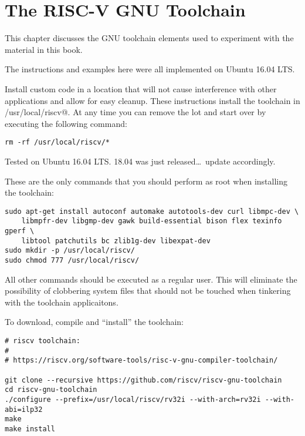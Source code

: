 \chapter{The RISC-V GNU Toolchain}

This chapter discusses the GNU toolchain elements used to
experiment with the material in this book.

The
instructions and examples here were all implemented on Ubuntu 16.04 LTS. 

Install custom code in a location that will not cause interference with
other applications and allow for easy cleanup.  These instructions 
install the toolchain in \verb@/usr/local/riscv@.  At any time
you can remove the lot and start over by executing the following 
command:

\begin{verbatim}
rm -rf /usr/local/riscv/*
\end{verbatim}


Tested on Ubuntu 16.04 LTS.   
18.04 was just released\ldots\ update accordingly.

These are the only commands that you should perform as root when installing
the toolchain:

\begin{verbatim}
sudo apt-get install autoconf automake autotools-dev curl libmpc-dev \
	libmpfr-dev libgmp-dev gawk build-essential bison flex texinfo gperf \
	libtool patchutils bc zlib1g-dev libexpat-dev
sudo mkdir -p /usr/local/riscv/
sudo chmod 777 /usr/local/riscv/ 
\end{verbatim}

All other commands should be executed as a regular user.  This will eliminate the
possibility of clobbering system files that should not be touched when tinkering with
the toolchain applicaitons.

To download, compile and ``install'' the toolchain:

\begin{verbatim}
# riscv toolchain:
# 
# https://riscv.org/software-tools/risc-v-gnu-compiler-toolchain/

git clone --recursive https://github.com/riscv/riscv-gnu-toolchain
cd riscv-gnu-toolchain
./configure --prefix=/usr/local/riscv/rv32i --with-arch=rv32i --with-abi=ilp32
make
make install
\end{verbatim}

